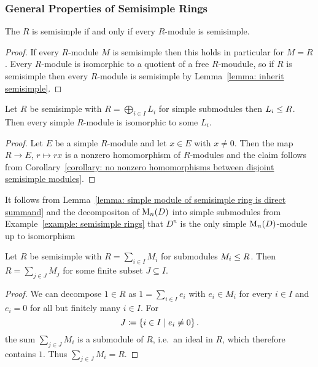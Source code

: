 \subsubsection{General Properties of Semisimple Rings}


\begin{proposition}
  The $R$ is semisimple if and only if every $R$-module is semisimple.
\end{proposition}


\begin{proof}
  If every $R$-module $M$ is semisimple then this holds in particular for $M = R$.
  Every $R$-module is isomorphic to a quotient of a free $R$-moudule, so if $R$ is semisimple then every $R$-module is semisimple by Lemma~\ref{lemma: inherit semisimple}.
\end{proof}


\begin{lemma}
  \label{lemma: simple module of semisimple ring is direct summand}
  Let $R$ be semisimple with $R = \bigoplus_{i \in I} L_i$ for simple submodules then $L_i \leq R$.
  Then every simple $R$-module is isomorphic to some $L_i$.
\end{lemma}


\begin{proof}
  Let $E$ be a simple $R$-module and let $x \in E$ with $x \neq 0$.
  Then the map $R \to E$, $r \mapsto rx$ is a nonzero homomorphism of $R$-modules and the claim follows from Corollary~\ref{corollary: no nonzero homomorphisms between disjoint semisimple modules}.
\end{proof}


\begin{example}
  \label{example: D^n is the only simple M_n(D)-module}
  It follows from Lemma~\ref{lemma: simple module of semisimple ring is direct summand} and the decompositon of $\operatorname{M}_n(D)$ into simple submodules from Example~\ref{example: semisimple rings} that $D^n$ is the only simple $\operatorname{M}_n(D)$-module up to isomorphism
\end{example}


\begin{lemma}
  \label{lemma: ring is already finite sum of submodules}
  Let $R$ be semisimple with $R = \sum_{i \in I} M_i$ for submodules $M_i \leq R$.
  Then $R = \sum_{j \in J} M_j$ for some finite subset $J \subseteq I$.
\end{lemma}


\begin{proof}
  We can decompose $1 \in R$ as $1 = \sum_{i \in I} e_i$ with $e_i \in M_i$ for every $i \in I$ and $e_i = 0$ for all but finitely many $i \in I$.
  For
  \[
              J
    \coloneqq  \{ i \in I \mid e_i \neq 0 \} \,.
  \]
  the sum $\sum_{j \in J} M_i$ is a submodule of $R$, i.e.\ an ideal in $R$, which therefore contains $1$.
  Thus $\sum_{j \in J} M_i = R$.
\end{proof}



